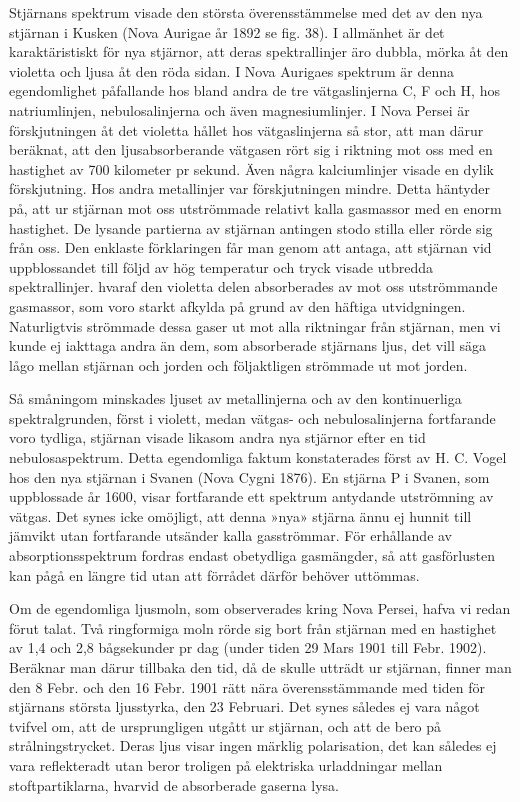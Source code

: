 \documentclass[a4paper, 12pt, oneside, swedish]{article}
\begin{document}
Stjärnans spektrum visade den största överensstämmelse med det av den nya stjärnan i Kusken (Nova Aurigae år 1892 se fig. 38). I allmänhet är det karaktäristiskt för nya stjärnor, att deras spektrallinjer äro dubbla, mörka åt den violetta och ljusa åt den röda sidan. I Nova Aurigaes spektrum är denna egendomlighet påfallande hos bland andra de tre vätgaslinjerna C, F och H, hos natriumlinjen, nebulosalinjerna och även magnesiumlinjer. I Nova Persei är förskjutningen åt det violetta hållet hos vätgaslinjerna så stor, att man därur beräknat, att den ljusabsorberande vätgasen rört sig i riktning mot oss med en hastighet av 700 kilometer pr sekund. Även några kalciumlinjer visade en dylik förskjutning. Hos andra metallinjer var förskjutningen mindre. Detta häntyder på, att ur stjärnan mot oss utströmmade relativt kalla gasmassor med en enorm hastighet. De lysande partierna av stjärnan antingen stodo stilla eller rörde sig från oss. Den enklaste förklaringen får man genom att antaga, att stjärnan vid uppblossandet till följd av hög temperatur och tryck visade utbredda spektrallinjer. hvaraf den violetta delen absorberades av mot oss utströmmande gasmassor, som voro starkt afkylda på grund av den häftiga utvidgningen. Naturligtvis strömmade dessa gaser ut mot alla riktningar från stjärnan, men vi kunde ej iakttaga andra än dem, som absorberade stjärnans ljus, det vill säga lågo mellan stjärnan och jorden och följaktligen strömmade ut mot jorden.

Så småningom minskades ljuset av metallinjerna och av den kontinuerliga spektralgrunden, först i violett, medan vätgas- och nebulosalinjerna fortfarande voro tydliga, stjärnan visade likasom andra nya stjärnor efter en tid nebulosaspektrum. Detta egendomliga faktum konstaterades först av H. C. Vogel hos den nya stjärnan i Svanen (Nova Cygni 1876). En stjärna P i Svanen, som uppblossade år 1600, visar fortfarande ett spektrum antydande utströmning av vätgas. Det synes icke omöjligt, att denna »nya» stjärna ännu ej hunnit till jämvikt utan fortfarande utsänder kalla gasströmmar. För erhållande av absorptionsspektrum fordras endast obetydliga gasmängder, så att gasförlusten kan pågå en längre tid utan att förrådet därför behöver uttömmas.

Om de egendomliga ljusmoln, som observerades kring Nova Persei, hafva vi redan förut talat. Två ringformiga moln rörde sig bort från stjärnan med en hastighet av 1,4 och 2,8 bågsekunder pr dag (under tiden 29 Mars 1901 till Febr. 1902). Beräknar man därur tillbaka den tid, då de skulle utträdt ur stjärnan, finner man den 8 Febr. och den 16 Febr. 1901 rätt nära överensstämmande med tiden för stjärnans största ljusstyrka, den 23 Februari. Det synes således ej vara något tvifvel om, att de ursprungligen utgått ur stjärnan, och att de bero på strålningstrycket. Deras ljus visar ingen märklig polarisation, det kan således ej vara reflekteradt utan beror troligen på elektriska urladdningar mellan stoftpartiklarna, hvarvid de absorberade gaserna lysa.
\end{document}
